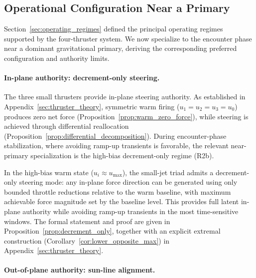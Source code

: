 \documentclass{article}
\begin{document}
\subsection{Operational Configuration Near a Primary}
\label{sec:operational_config}

Section~\ref{sec:operating_regimes} defined the principal operating regimes supported by the four-thruster system. We now specialize to the encounter phase near a dominant gravitational primary, deriving the corresponding preferred configuration and authority limits.

\paragraph{In-plane authority: decrement-only steering.}

The three small thrusters provide in-plane steering authority. As established in Appendix~\ref{sec:thruster_theory}, symmetric warm firing ($u_1=u_2=u_3=u_0$) produces zero net force (Proposition~\ref{prop:warm_zero_force}), while steering is achieved through differential reallocation (Proposition~\ref{prop:differential_decomposition}). During encounter-phase stabilization, where avoiding ramp-up transients is favorable, the relevant near-primary specialization is the high-bias decrement-only regime (R2b).

In the high-bias warm state ($u_i \approx u_{\max}$), the small-jet triad admits a decrement-only steering mode: any in-plane force direction can be generated using only bounded throttle reductions relative to the warm baseline, with maximum achievable force magnitude set by the baseline level. This provides full latent in-plane authority while avoiding ramp-up transients in the most time-sensitive windows. The formal statement and proof are given in Proposition~\ref{prop:decrement_only}, together with an explicit extremal construction (Corollary~\ref{cor:lower_opposite_max}) in Appendix~\ref{sec:thruster_theory}.


\paragraph{Out-of-plane authority: sun-line alignment.}
\end{document}
